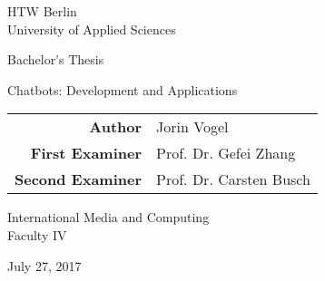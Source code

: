 \documentclass[12pt, headinclude, parskip=half+, numbers=noenddot, openright]{scrreprt}
\begin{document}
\pagestyle{empty} %

\clearscrheadings\clearscrplain
\begin{center}

HTW Berlin\\
University of Applied Sciences

\vspace{2cm}

Bachelor's Thesis

\vspace{1cm}

\begin{Large}
  Chatbots: Development and Applications
  \vspace{3cm}
\end{Large}

\begin{tabular}{rl}
{\bfseries Author} & Jorin Vogel\\
{\bfseries First Examiner} & Prof. Dr. Gefei Zhang\\
{\bfseries Second Examiner} & Prof. Dr. Carsten Busch\\
\end{tabular}

\vspace{3cm}

International Media and Computing\\
Faculty IV

\vspace{6cm}

July 27, 2017

\end{center}

\clearpage




\tableofcontents

\listoffigures























\begin{appendices}

\end{appendices}
\end{document}
